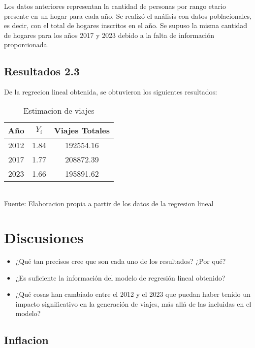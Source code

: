 \documentclass[12pt]{article} %
\begin{document}
Los datos anteriores representan la cantidad de personas por rango etario presente en un hogar para cada año. 
Se realizó el análisis con datos poblacionales, es decir, con el total de hogares inscritos en el año. Se supuso la misma
cantidad de hogares para los años 2017 y 2023 debido a la falta de información proporcionada.

\subsection{Resultados 2.3}

De la regrecion lineal obtenida, se obtuvieron los siguientes resultados:

\begin{table}[H]
    \centering
    \caption{Estimacion de viajes}
    \vspace{0.2cm}
    \begin{tabular}{|c|c|c|}
        \hline
        Año & $Y_i$ & Viajes Totales \\
        \hline
        2012 & 1.84 & 192554.16\\
        2017 & 1.77 & 208872.39\\
        2023 & 1.66 & 195891.62\\
        \hline
    \end{tabular}
    \vspace{0.2cm}
    \\ Fuente: Elaboracion propia a partir de los datos de la regresion lineal
\end{table}

\section{Discusiones}

\begin{itemize}
    \item ¿Qué tan precisos cree que son cada uno de los resultados? ¿Por qué?
    \item ¿Es suficiente la información del modelo de regresión lineal obtenido?
    \item ¿Qué cosas han cambiado entre el 2012 y el 2023 que puedan haber tenido un impacto significativo en la generación de viajes, más allá de las incluidas en el modelo?
\end{itemize}

\subsection{Inflacion}
\end{document}
